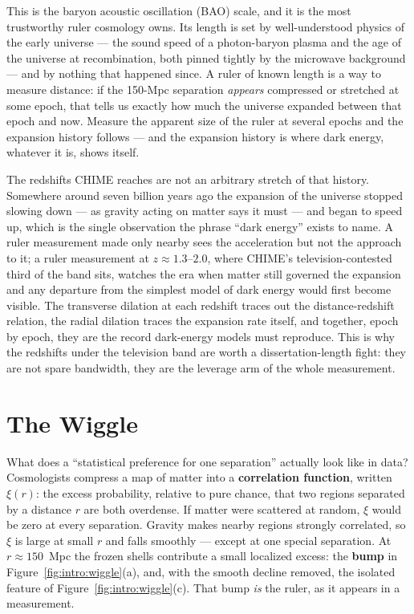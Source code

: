 This is the baryon acoustic oscillation (BAO) scale, and it is the most trustworthy ruler cosmology owns. Its length is set by well-understood physics of the early universe --- the sound speed of a photon-baryon plasma and the age of the universe at recombination, both pinned tightly by the microwave background --- and by nothing that happened since. A ruler of known length is a way to measure distance: if the 150-Mpc separation \emph{appears} compressed or stretched at some epoch, that tells us exactly how much the universe expanded between that epoch and now. Measure the apparent size of the ruler at several epochs and the expansion history follows --- and the expansion history is where dark energy, whatever it is, shows itself.

The redshifts CHIME reaches are not an arbitrary stretch of that history. Somewhere around seven billion years ago the expansion of the universe stopped slowing down --- as gravity acting on matter says it must --- and began to speed up, which is the single observation the phrase ``dark energy'' exists to name. A ruler measurement made only nearby sees the acceleration but not the approach to it; a ruler measurement at $z \approx 1.3$--$2.0$, where CHIME's television-contested third of the band sits, watches the era when matter still governed the expansion and any departure from the simplest model of dark energy would first become visible. The transverse dilation at each redshift traces out the distance-redshift relation, the radial dilation traces the expansion rate itself, and together, epoch by epoch, they are the record dark-energy models must reproduce. This is why the redshifts under the television band are worth a dissertation-length fight: they are not spare bandwidth, they are the leverage arm of the whole measurement.

\section{The Wiggle}
\label{sec:intro:wiggle}

What does a ``statistical preference for one separation'' actually look like in data? Cosmologists compress a map of matter into a \textbf{correlation function}, written $\xi(r)$: the excess probability, relative to pure chance, that two regions separated by a distance $r$ are both overdense. If matter were scattered at random, $\xi$ would be zero at every separation. Gravity makes nearby regions strongly correlated, so $\xi$ is large at small $r$ and falls smoothly --- except at one special separation. At $r \approx 150$~Mpc the frozen shells contribute a small localized excess: the \textbf{bump} in Figure~\ref{fig:intro:wiggle}(a), and, with the smooth decline removed, the isolated feature of Figure~\ref{fig:intro:wiggle}(c). That bump \emph{is} the ruler, as it appears in a measurement.

